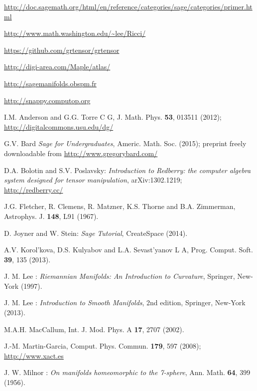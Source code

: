 \begin{thebibliography}{123}

\url{http://doc.sagemath.org/html/en/reference/categories/sage/categories/primer.html}

\url{http://www.math.washington.edu/~lee/Ricci/}

\url{https://github.com/grtensor/grtensor}

\url{http://digi-area.com/Maple/atlas/}

\url{http://sagemanifolds.obspm.fr}

\url{http://snappy.computop.org}

I.M. Anderson and G.G. Torre C G, J. Math. Phys. {\bf 53}, 013511 (2012);\\
\url{http://digitalcommons.usu.edu/dg/}

G.V. Bard {\it Sage for Undergraduates}, Americ. Math. Soc. (2015);
preprint freely downloadable from \url{http://www.gregorybard.com/}

D.A. Bolotin and S.V. Poslavsky: \emph{Introduction to Redberry: the computer algebra system designed for tensor manipulation}, arXiv:1302.1219;\\
\url{http://redberry.cc/}

J.G. Fletcher, R. Clemens, R. Matzner, K.S. Thorne and B.A. Zimmerman,
Astrophys. J. {\bf 148}, L91 (1967).

D. Joyner and W. Stein: {\it Sage Tutorial}, CreateSpace (2014).

A.V. Korol'kova, D.S. Kulyabov and L.A. Sevast'yanov L A, Prog. Comput. Soft.
{\bf 39}, 135 (2013).

J. M. Lee : {\em Riemannian Manifolds: An Introduction to Curvature},
Springer, New-York (1997).

J. M. Lee : {\em Introduction to Smooth Manifolds}, 2nd edition,
Springer, New-York (2013).

M.A.H. MacCallum, Int. J. Mod. Phys. A {\bf 17}, 2707 (2002).

J.-M. Martin-Garcia, Comput. Phys. Commun. {\bf 179}, 597 (2008);\\
\url{http://www.xact.es}

J. W. Milnor : {\em On manifolds homeomorphic to the 7-sphere},
Ann. Math. {\bf 64}, 399 (1956).


\end{thebibliography}
